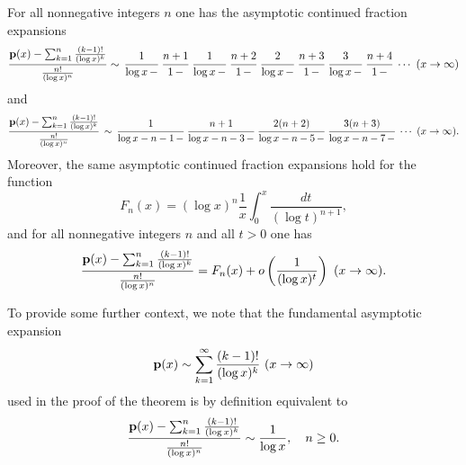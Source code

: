 \documentclass[12pt]{article}
\begin{document}
\begin{theorem}\label{gentheorem}
For all nonnegative integers $n$ one has the asymptotic continued fraction expansions
$$\frac{{\mathbf p}(x) - \sum_{k = 1}^{n} \frac{(k-1)!}{(\log x)^{k}}}{\frac{n!}{(\log x)^{n}}} \sim \,  \cfrac{1}{\log x \,-} \ \cfrac{n+1}{1 \,-}\  \cfrac{1}{\log x \,-}\  \cfrac{n+2}{1 \,-}\  \cfrac{2}{\log x \,-}\  \cfrac{n+3}{1 \,-} \  \cfrac{3}{\log x \,-}\  \cfrac{n+4}{1 \,-}  \ \cdots \ (x \to \infty)$$
and
$$\frac{{\mathbf p}(x) - \sum_{k = 1}^{n} \frac{(k-1)!}{(\log x)^{k}}}{\frac{n!}{(\log x)^{n}}}  \,  \sim \, \cfrac{1}{\log x -n-1\,-} \  \cfrac{n+1}{\log x - n - 3 \,-}\  \cfrac{2(n+2)}{\log x-n-5 \,-}\  \cfrac{3(n+3)}{\log x - n - 7 \,-}  \ \cdots \  (x \to \infty).$$
Moreover, the same asymptotic continued fraction expansions hold for the function $$F_n(x) = {(\log x)^{n}}\frac{1}{x} \int_0^x \frac{dt} {(\log t)^{n+1}},$$ and  for all nonnegative integers $n$ and all $t > 0$ one has
$$ \frac{{\mathbf p}(x) - \sum_{k = 1}^{n} \frac{(k-1)!}{(\log x)^{k}}}{\frac{n!}{(\log x)^{n}}} =  F_n(x) + o\left( \frac{1}{(\log x)^t}\right) \ (x \to \infty).$$
\end{theorem}

To provide some further context, we note that the fundamental asymptotic expansion
\begin{align*}
{\mathbf p}(x) \sim \sum_{k = 1}^\infty {\frac {(k-1)!}{(\log x)^{k}}} \ (x \to \infty)
\end{align*}
used in the proof of the theorem is by definition equivalent to 
\begin{align*}
\frac{{\mathbf p}(x) - \sum_{k = 1}^{n} \frac{(k-1)!}{(\log x)^{k}}}{\frac{n!}{(\log x)^{n}}}  \sim \frac{1}{\log x}, \quad n \geq 0.
\end{align*}
\end{document}
